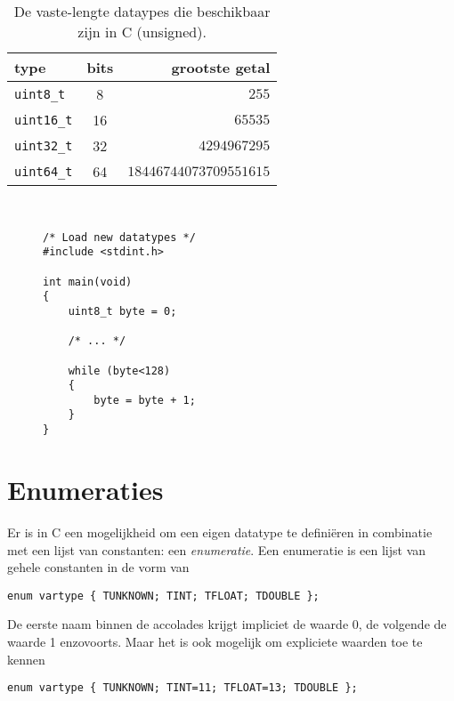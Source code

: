 \begin{table}[!ht]
\centering
\caption{De vaste-lengte dataypes die beschikbaar zijn in C (unsigned).}
\label{tab:varuinttdatatypes}
\begin{tabular}{@{}lcr@{}}
\toprule
\textbf{type}          & \textbf{bits} & \textbf{grootste getal} \\ \midrule
\texttt{uint8\_t}       & 8             & $255$                   \\
\texttt{uint16\_t}      & 16            & $65535$                 \\
\texttt{uint32\_t}      & 32            & $4294967295$            \\
\texttt{uint64\_t}      & 64            & $18446744073709551615$   \\
\bottomrule
\end{tabular}\\
\end{table}

\begin{figure}[!ht]
\begin{lstlisting}[caption=Voorbeeld van het gebruik van vaste-lengte datatypes.,label=cod:vastelengte]
/* Load new datatypes */
#include <stdint.h>

int main(void)
{
    uint8_t byte = 0;
    
    /* ... */
    
    while (byte<128)
    {
        byte = byte + 1;
    }
}
\end{lstlisting}
\end{figure}


\section{Enumeraties}
\label{sec:enumeraties}
Er is in C een mogelijkheid om een eigen datatype te definiëren in combinatie met een lijst van constanten: een \textsl{enumeratie}. Een enumeratie is een lijst van gehele constanten in de vorm van

\hspace*{1em}\texttt{enum vartype \{ TUNKNOWN; TINT; TFLOAT; TDOUBLE \};}

De eerste naam binnen de accolades krijgt impliciet de waarde 0, de volgende de waarde 1 enzovoorts. Maar het is ook mogelijk om expliciete waarden toe te kennen

\hspace*{1em}\texttt{enum vartype \{ TUNKNOWN; TINT=11; TFLOAT=13; TDOUBLE \};}

